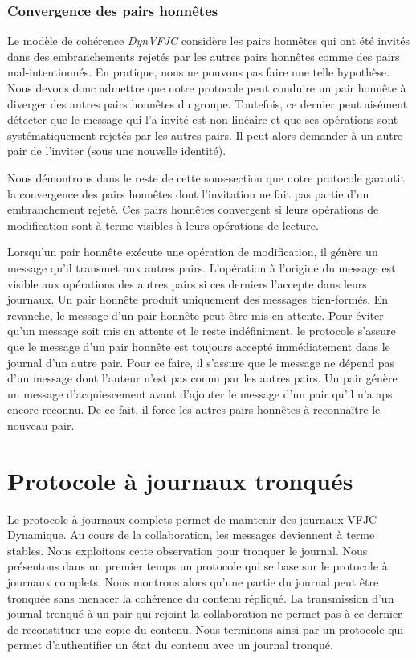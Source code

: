 \subsubsection{Convergence des pairs honnêtes}

Le modèle de cohérence \emph{DynVFJC} considère les pairs honnêtes qui ont été invités dans des embranchements rejetés par les autres pairs honnêtes comme des pairs mal-intentionnés.
En pratique, nous ne pouvons pas faire une telle hypothèse.
Nous devons donc admettre que notre protocole peut conduire un pair honnête à diverger des autres pairs honnêtes du groupe.
Toutefois, ce dernier peut aisément détecter que le message qui l'a invité est non-linéaire et que ses opérations sont systématiquement rejetés par les autres pairs.
Il peut alors demander à un autre pair de l'inviter (sous une nouvelle identité).

Nous démontrons dans le reste de cette sous-section que notre protocole garantit la convergence des pairs honnêtes dont l'invitation ne fait pas partie d'un embranchement rejeté.
Ces pairs honnêtes convergent si leurs opérations de modification sont à terme visibles à leurs opérations de lecture.

Lorsqu'un pair honnête exécute une opération de modification, il génère un message qu'il transmet aux autres pairs.
L'opération à l'origine du message est visible aux opérations des autres pairs si ces derniers l'accepte dans leurs journaux.
Un pair honnête produit uniquement des messages bien-formés.
En revanche, le message d'un pair honnête peut être mis en attente.
Pour éviter qu'un message soit mis en attente et le reste indéfiniment, le protocole s'assure que le message d'un pair honnête est toujours accepté immédiatement dans le journal d'un autre pair.
Pour ce faire, il s'assure que le message ne dépend pas d'un message dont l'auteur n'est pas connu par les autres pairs.
Un pair génère un message d'acquiescement avant d'ajouter le message d'un pair qu'il n'a aps encore reconnu.
De ce fait, il force les autres pairs honnêtes à reconnaître le nouveau pair.

\clearpage

\section{Protocole à journaux tronqués}\label{sec:pruned-log-protocol}

Le protocole à journaux complets permet de maintenir des journaux \acl{VFJC} Dynamique.
Au cours de la collaboration, les messages deviennent à terme stables.
Nous exploitons cette observation pour tronquer le journal.
Nous présentons dans un premier temps un protocole qui se base sur le protocole à journaux complets.
Nous montrons alors qu'une partie du journal peut être tronquée sans menacer la cohérence du contenu répliqué.
La transmission d'un journal tronqué à un pair qui rejoint la collaboration ne permet pas à ce dernier de reconstituer une copie du contenu.
Nous terminons ainsi par un protocole qui permet d'authentifier un état du contenu avec un journal tronqué.

